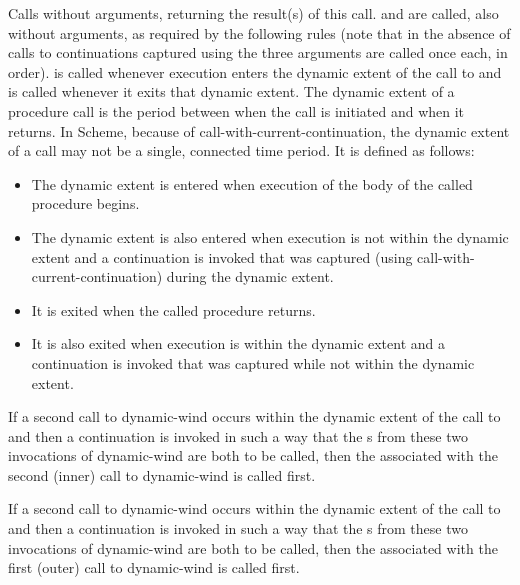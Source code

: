 \begin{entry}{%
}

Calls  without arguments, returning the result(s) of this call.
 and  are called, also without arguments, as required
by the following rules (note that in the absence of calls to continuations
captured using  the three arguments are
called once each, in order).   is called whenever execution
enters the dynamic extent of the call to  and  is called
whenever it exits that dynamic extent.  The dynamic extent of a procedure
call is the period between when the call is initiated and when it
returns.  In Scheme, because of {\cf call-with-current-continuation}, the
dynamic extent of a call may not be a single, connected time period.
It is defined as follows:
\begin{itemize}
\item The dynamic extent is entered when execution of the body of the
called procedure begins.

\item The dynamic extent is also entered when execution is not within
the dynamic extent and a continuation is invoked that was captured
(using {\cf call-with-current-continuation}) during the dynamic extent.

\item It is exited when the called procedure returns.

\item It is also exited when execution is within the dynamic extent and
a continuation is invoked that was captured while not within the
dynamic extent.
\end{itemize}

If a second call to {\cf dynamic-wind} occurs within the dynamic extent of the
call to  and then a continuation is invoked in such a way that the
s from these two invocations of {\cf dynamic-wind} are both to be
called, then the  associated with the second (inner) call to
{\cf dynamic-wind} is called first.

If a second call to {\cf dynamic-wind} occurs within the dynamic extent of the
call to  and then a continuation is invoked in such a way that the
s from these two invocations of {\cf dynamic-wind} are both to be
called, then the  associated with the first (outer) call to
{\cf dynamic-wind} is called first.


\end{entry}
